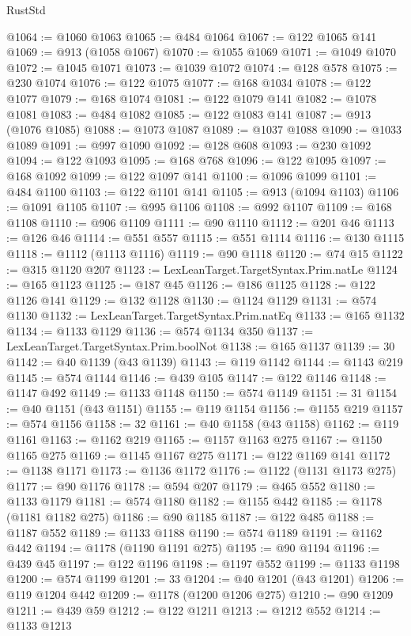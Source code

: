 \begin{lexlean}{RustStd}
\begin{coremodule}
{\begin{coremodule}
{{{{{{{{{{{{{{{{{{{{{{{{{{{{{{{{{{{{{{{{{{{{{{{@1064 := @1060 @1063
@1065 := @484 @1064
@1067 := @122 @1065 @141
@1069 := @913 (@1058 @1067)
@1070 := @1055 @1069
@1071 := @1049 @1070
@1072 := @1045 @1071
@1073 := @1039 @1072
@1074 := @128 @578
@1075 := @230 @1074
@1076 := @122 @1075
@1077 := @168 @1034
@1078 := @122 @1077
@1079 := @168 @1074
@1081 := @122 @1079 @141
@1082 := @1078 @1081
@1083 := @484 @1082
@1085 := @122 @1083 @141
@1087 := @913 (@1076 @1085)
@1088 := @1073 @1087
@1089 := @1037 @1088
@1090 := @1033 @1089
@1091 := @997 @1090
@1092 := @128 @608
@1093 := @230 @1092
@1094 := @122 @1093
@1095 := @168 @768
@1096 := @122 @1095
@1097 := @168 @1092
@1099 := @122 @1097 @141
@1100 := @1096 @1099
@1101 := @484 @1100
@1103 := @122 @1101 @141
@1105 := @913 (@1094 @1103)
@1106 := @1091 @1105
@1107 := @995 @1106
@1108 := @992 @1107
@1109 := @168 @1108
@1110 := @906 @1109
@1111 := @90 @1110
@1112 := @201 @46
@1113 := @126 @46
@1114 := @551 @557
@1115 := @551 @1114
@1116 := @130 @1115
@1118 := @1112 (@1113 @1116)
@1119 := @90 @1118
@1120 := @74 @15
@1122 := @315 @1120 @207
@1123 := LexLeanTarget.TargetSyntax.Prim.natLe
@1124 := @165 @1123
@1125 := @187 @45
@1126 := @186 @1125
@1128 := @122 @1126 @141
@1129 := @132 @1128
@1130 := @1124 @1129
@1131 := @574 @1130
@1132 := LexLeanTarget.TargetSyntax.Prim.natEq
@1133 := @165 @1132
@1134 := @1133 @1129
@1136 := @574 @1134 @350
@1137 := LexLeanTarget.TargetSyntax.Prim.boolNot
@1138 := @165 @1137
@1139 := 30
@1142 := @40 @1139 (@43 @1139)
@1143 := @119 @1142
@1144 := @1143 @219
@1145 := @574 @1144
@1146 := @439 @105
@1147 := @122 @1146
@1148 := @1147 @492
@1149 := @1133 @1148
@1150 := @574 @1149
@1151 := 31
@1154 := @40 @1151 (@43 @1151)
@1155 := @119 @1154
@1156 := @1155 @219
@1157 := @574 @1156
@1158 := 32
@1161 := @40 @1158 (@43 @1158)
@1162 := @119 @1161
@1163 := @1162 @219
@1165 := @1157 @1163 @275
@1167 := @1150 @1165 @275
@1169 := @1145 @1167 @275
@1171 := @122 @1169 @141
@1172 := @1138 @1171
@1173 := @1136 @1172
@1176 := @1122 (@1131 @1173 @275)
@1177 := @90 @1176
@1178 := @594 @207
@1179 := @465 @552
@1180 := @1133 @1179
@1181 := @574 @1180
@1182 := @1155 @442
@1185 := @1178 (@1181 @1182 @275)
@1186 := @90 @1185
@1187 := @122 @485
@1188 := @1187 @552
@1189 := @1133 @1188
@1190 := @574 @1189
@1191 := @1162 @442
@1194 := @1178 (@1190 @1191 @275)
@1195 := @90 @1194
@1196 := @439 @45
@1197 := @122 @1196
@1198 := @1197 @552
@1199 := @1133 @1198
@1200 := @574 @1199
@1201 := 33
@1204 := @40 @1201 (@43 @1201)
@1206 := @119 @1204 @442
@1209 := @1178 (@1200 @1206 @275)
@1210 := @90 @1209
@1211 := @439 @59
@1212 := @122 @1211
@1213 := @1212 @552
@1214 := @1133 @1213
}}}}}}}}}}}}}}}}}}}}}}}}}}}}}}}}}}}}}}}}}}}}}}}
\end{coremodule}}
\end{coremodule}
\end{lexlean}
